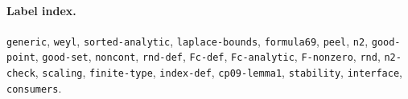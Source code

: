 \paragraph{Label index.} \texttt{generic}, \texttt{weyl}, \texttt{sorted-analytic}, \texttt{laplace-bounds}, \texttt{formula69}, \texttt{peel}, \texttt{n2}, \texttt{good-point}, \texttt{good-set}, \texttt{noncont}, \texttt{rnd-def}, \texttt{Fc-def}, \texttt{Fc-analytic}, \texttt{F-nonzero}, \texttt{rnd}, \texttt{n2-check}, \texttt{scaling}, \texttt{finite-type}, \texttt{index-def}, \texttt{cp09-lemma1}, \texttt{stability}, \texttt{interface}, \texttt{consumers}.
\par\endgroup
